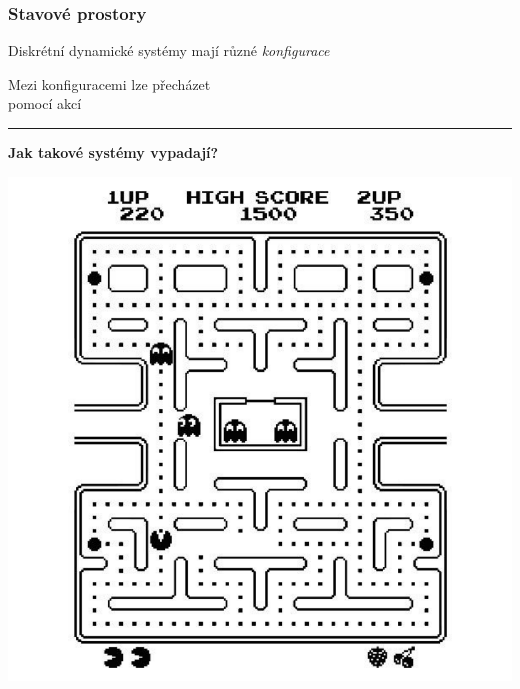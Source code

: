 \documentclass[usenames,dvipsnames,9pt]{beamer}
\begin{document}
\begin{frame}
  \frametitle{Stavové prostory}
  
   \begin{minipage}{0.5\linewidth}
   Diskrétní dynamické systémy mají různé \textit{konfigurace}
   
    \vspace{1em}
 
    Mezi konfiguracemi lze přecházet\\ pomocí akcí
    
    \vspace{4em}\hrule\vspace{2em}
 
    \hfill{\bf Jak takové systémy vypadají?}
  \end{minipage}
  \hfill
  \begin{minipage}{0.4\linewidth}
    \includegraphics[width=1.1\linewidth]{figs/pacman2.pdf}
  \end{minipage}
 
  

\end{frame}
\end{document}
